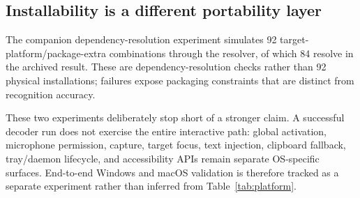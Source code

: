 \subsection{Installability is a different portability layer}

The companion dependency-resolution experiment simulates 92 target-platform/package-extra
combinations through the resolver, of which 84 resolve in the archived result. These are
dependency-resolution checks rather than 92 physical installations; failures expose packaging
constraints that are distinct from recognition accuracy.

These two experiments deliberately stop short of a stronger claim. A successful decoder run does
not exercise the entire interactive path: global activation, microphone permission, capture,
target focus, text injection, clipboard fallback, tray/daemon lifecycle, and accessibility APIs
remain separate OS-specific surfaces. End-to-end Windows and macOS validation is therefore
tracked as a separate experiment rather than inferred from Table~\ref{tab:platform}.